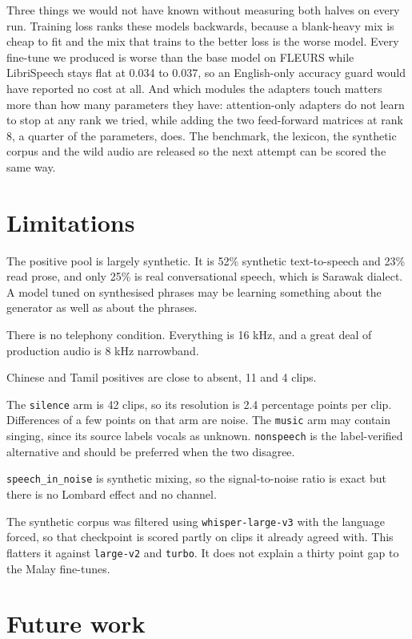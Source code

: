 \documentclass[preprint]{article}
\begin{document}
Three things we would not have known without measuring both halves on every run. Training loss
ranks these models backwards, because a blank-heavy mix is cheap to fit and the mix that trains
to the better loss is the worse model. Every fine-tune we produced is worse than the base model
on FLEURS while LibriSpeech stays flat at 0.034 to 0.037, so an English-only accuracy guard
would have reported no cost at all. And which modules the adapters touch matters more than how
many parameters they have: attention-only adapters do not learn to stop at any rank we tried,
while adding the two feed-forward matrices at rank 8, a quarter of the parameters, does. The benchmark, the lexicon, the synthetic corpus and
the wild audio are released so the next attempt can be scored the same way.

\section{Limitations}

The positive pool is largely synthetic. It is 52\% synthetic text-to-speech and 23\% read prose,
and only 25\% is real conversational speech, which is Sarawak dialect. A model tuned on
synthesised phrases may be learning something about the generator as well as about the phrases.

There is no telephony condition. Everything is 16 kHz, and a great deal of production audio is
8 kHz narrowband.

Chinese and Tamil positives are close to absent, 11 and 4 clips.

The \texttt{silence} arm is 42 clips, so its resolution is 2.4 percentage points per clip.
Differences of a few points on that arm are noise. The \texttt{music} arm may contain singing,
since its source labels vocals as unknown. \texttt{nonspeech} is the label-verified alternative
and should be preferred when the two disagree.

\texttt{speech\_in\_noise} is synthetic mixing, so the signal-to-noise ratio is exact but there
is no Lombard effect and no channel.

The synthetic corpus was filtered using \texttt{whisper-large-v3} with the language forced, so
that checkpoint is scored partly on clips it already agreed with. This flatters it against
\texttt{large-v2} and \texttt{turbo}. It does not explain a thirty point gap to the Malay
fine-tunes.

\section{Future work}
\end{document}
